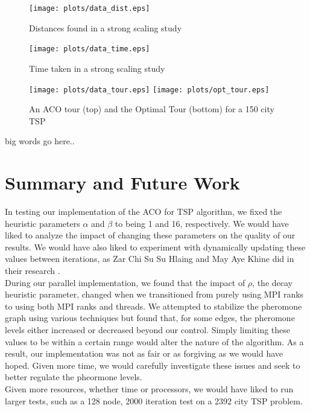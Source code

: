 \documentclass[twocolumn]{article}
\begin{document}
\begin{figure}
  \centering
  \texttt{[image: plots/data\_dist.eps]}
  \caption{Distances found in a strong scaling study} \label{fig:dist}
\end{figure}

\begin{figure}
  \centering
  \texttt{[image: plots/data\_time.eps]}
  \caption{Time taken in a strong scaling study} \label{fig:time}
\end{figure}

\begin{figure}
  \centering
  \texttt{[image: plots/data\_tour.eps]}
  \texttt{[image: plots/opt\_tour.eps]}
  \caption{An ACO tour (top) and the Optimal Tour (bottom) for a 150 city TSP} 
  \label{fig:tours}
\end{figure}

big words go here..\\


\section{Summary and Future Work}

In testing our implementation of the ACO for TSP algorithm, we fixed the 
heuristic parameters $\alpha$ and $\beta$ to being 1 and 16, respectively. We 
would have liked to analyze the impact of changing these parameters on the
quality of our results. We would have also liked to experiment with dynamically
updating these values between iterations, as Zar Chi Su Su Hlaing and May Aye 
Khine did in their research \cite{ipcsit:aco}. \\

During our parallel implementation, we found that the impact of $\rho$, the 
decay heuristic parameter, changed when we transitioned from purely using MPI
ranks to using both MPI ranks and threads. We attempted to stabilize the 
pheromone graph using various techniques but found that, for some edges, the
pheromone levels either increased or decreased beyond our control. Simply 
limiting these values to be within a certain range would alter the nature of the
algorithm. As a result, our implementation was not as fair or as forgiving as we
would have hoped. Given more time, we would carefully investigate these issues
and seek to better regulate the pheormone levels. \\

Given more resources, whether time or processors, we would have liked to run 
larger tests, such as a 128 node, 2000 iteration test on a 2392 city TSP 
problem. 
\end{document}
